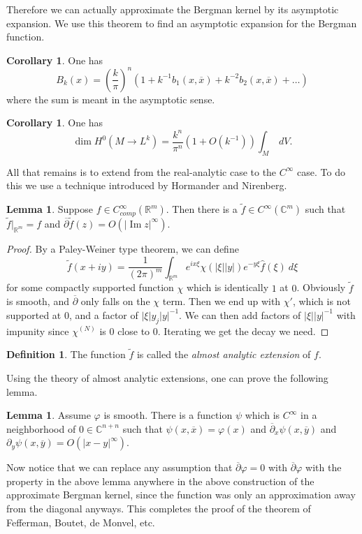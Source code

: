 \documentclass[12pt]{report}
\newcommand{\RR}{\mathbb{R}}
\newcommand{\CC}{\mathbb{C}}
\newcommand{\dbar}{\overline\partial}
\renewcommand{\Im}{\operatorname{Im}}
\newcommand{\dfn}[1]{\emph{#1}\index{#1}}
\theoremstyle{definition}
\newtheorem{lemma}[theorem]{Lemma}
\newtheorem{corollary}[theorem]{Corollary}
\newtheorem{definition}[theorem]{Definition}
\begin{document}
    Therefore we can actually approximate the Bergman kernel by its asymptotic expansion. We use this theorem to find an asymptotic expansion for the Bergman function.
\begin{corollary}
    One has
    $$B_k(x) = \left(\frac{k}{\pi}\right)^n(1 + k^{-1}b_1(x, \overline x) + k^{-2}b_2(x, \overline x) + \dots)$$
    where the sum is meant in the asymptotic sense.
\end{corollary}
\begin{corollary}
    One has
    $$\dim H^0(M \to L^k) = \frac{k^n}{\pi^n}(1 + O(k^{-1})) \int_M ~dV.$$
\end{corollary}
    All that remains is to extend from the real-analytic case to the $C^\infty$ case. To do this we use a technique introduced by Hormander and Nirenberg.
\begin{lemma}
    Suppose $f \in C^\infty_{comp}(\RR^m)$. Then there is a $\tilde f \in C^\infty(\CC^m)$ such that $\tilde f|_{\RR^m} =f$ and $\dbar \tilde f(z) = O(|\Im z|^\infty)$.
\end{lemma}
\begin{proof}
    By a Paley-Weiner type theorem, we can define
    $$\tilde f(x + iy) = \frac{1}{(2\pi)^m} \int_{\RR^m} e^{ix\xi} \chi(|\xi||y|)e^{-y\xi} \hat f(\xi) ~d\xi$$
    for some compactly supported function $\chi$ which is identically $1$ at $0$. Obviously $\tilde f$ is smooth, and $\dbar$ only falls on the $\chi$ term. Then we end up with $\chi'$, which is not supported at $0$, and a factor of $|\xi|y_j|y|^{-1}$. We can then add factors of $|\xi||y|^{-1}$ with impunity since $\chi^{(N)}$ is $0$ close to $0$. Iterating we get the decay we need.
\end{proof}
\begin{definition}
    The function $\tilde f$ is called the \dfn{almost analytic extension} of $f$.
\end{definition}
    Using the theory of almost analytic extensions, one can prove the following lemma.
\begin{lemma}
    Assume $\varphi$ is smooth. There is a function $\psi$ which is $C^\infty$ in a neighborhood of $0 \in \CC^{n + n}$ such that $\psi(x, \overline x) = \varphi(x)$ and $\dbar_x\psi(x, \overline y)$ and $\partial_y\psi(x, \overline y) = O(|x - y|^\infty)$.
\end{lemma}
    Now notice that we can replace any assumption that $\dbar \varphi = 0$ with $\dbar \varphi$ with the property in the above lemma anywhere in the above construction of the approximate Bergman kernel, since the function was only an approximation away from the diagonal anyways. This completes the proof of the theorem of Fefferman, Boutet, de Monvel, etc.
\end{document}
